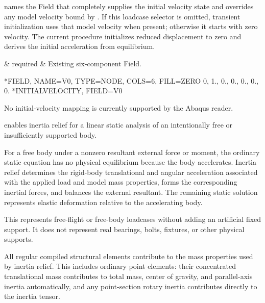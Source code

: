  names the Field that completely supplies the initial velocity state and overrides any model velocity bound by . If this loadcase selector is omitted, transient initialization uses that model velocity when present; otherwise it starts with zero velocity. The current procedure initializes reduced displacement to zero and derives the initial acceleration from equilibrium.

\begin{keywordparameters}
 & required & Existing six-component  Field. \\
\end{keywordparameters}

\exampleheading
\begin{dialectexamples}
\begin{femasterdeck}
*FIELD, NAME=V0, TYPE=NODE,
 COLS=6, FILL=ZERO
0, 1., 0., 0., 0., 0., 0.
*INITIALVELOCITY, FIELD=V0
\end{femasterdeck}
\begin{noabaqus}
No initial-velocity mapping is currently supported by the Abaqus reader.
\end{noabaqus}
\end{dialectexamples}


 enables inertia relief for a linear static analysis of an intentionally free or insufficiently supported body.

For a free body under a nonzero resultant external force or moment, the ordinary static equation has no physical equilibrium because the body accelerates. Inertia relief determines the rigid-body translational and angular acceleration associated with the applied load and model mass properties, forms the corresponding inertial forces, and balances the external resultant. The remaining static solution represents elastic deformation relative to the accelerating body.

This represents free-flight or free-body loadcases without adding an artificial fixed support. It does not represent real bearings, bolts, fixtures, or other physical supports.

All regular compiled structural elements contribute to the mass properties used by inertia relief. This includes ordinary  point elements: their concentrated translational mass contributes to total mass, center of gravity, and parallel-axis inertia automatically, and any point-section rotary inertia contributes directly to the inertia tensor.

